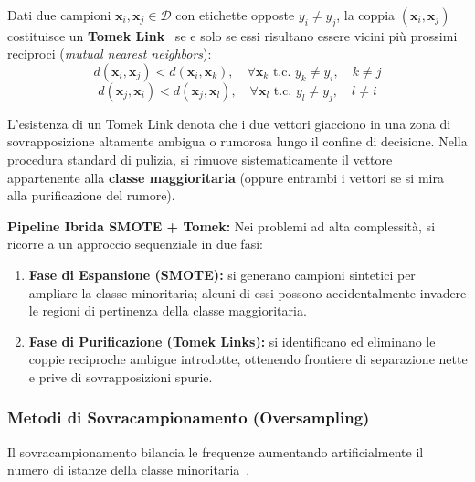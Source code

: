 \begin{definition}
Dati due campioni $\mathbf{x}_i, \mathbf{x}_j \in \mathcal{D}$ con etichette opposte $y_i \neq y_j$, la coppia $(\mathbf{x}_i, \mathbf{x}_j)$ costituisce un \textbf{Tomek Link}~\cite{tomek1976} se e solo se essi risultano essere vicini più prossimi reciproci (\textit{mutual nearest neighbors}):
\begin{equation}
    d(\mathbf{x}_i, \mathbf{x}_j) < d(\mathbf{x}_i, \mathbf{x}_k), \quad \forall \mathbf{x}_k \text{ t.c. } y_k \neq y_i, \quad k \neq j
\end{equation}
\begin{equation}
    d(\mathbf{x}_j, \mathbf{x}_i) < d(\mathbf{x}_j, \mathbf{x}_l), \quad \forall \mathbf{x}_l \text{ t.c. } y_l \neq y_j, \quad l \neq i
\end{equation}
\end{definition}

L'esistenza di un Tomek Link denota che i due vettori giacciono in una zona di sovrapposizione altamente ambigua o rumorosa lungo il confine di decisione. Nella procedura standard di pulizia, si rimuove sistematicamente il vettore appartenente alla \textbf{classe maggioritaria} (oppure entrambi i vettori se si mira alla purificazione del rumore).

\textbf{Pipeline Ibrida SMOTE + Tomek:}
Nei problemi ad alta complessità, si ricorre a un approccio sequenziale in due fasi:
\begin{enumerate}
    \item \textbf{Fase di Espansione (SMOTE):} si generano campioni sintetici per ampliare la classe minoritaria; alcuni di essi possono accidentalmente invadere le regioni di pertinenza della classe maggioritaria.
    \item \textbf{Fase di Purificazione (Tomek Links):} si identificano ed eliminano le coppie reciproche ambigue introdotte, ottenendo frontiere di separazione nette e prive di sovrapposizioni spurie.
\end{enumerate}

\FloatBarrier
\subsubsection{Metodi di Sovracampionamento (Oversampling)}
\label{subsec:dm-oversampling}

Il sovracampionamento bilancia le frequenze aumentando artificialmente il numero di istanze della classe minoritaria~\cite{mannocci2026imbalanced}.

